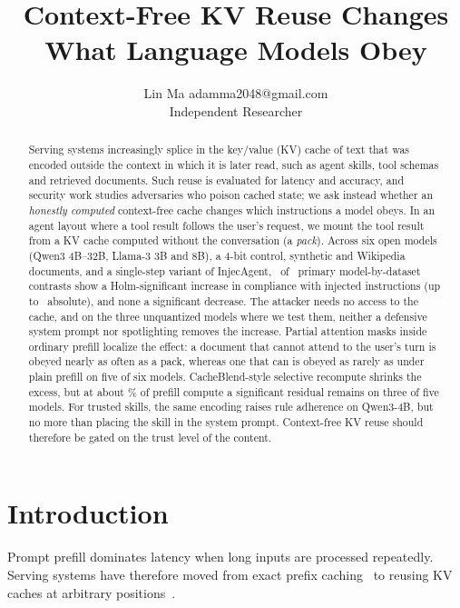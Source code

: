 \documentclass[10pt]{article}
\title{Context-Free KV Reuse Changes What Language Models Obey}
\author{\name Lin Ma \email adamma2048@gmail.com \\
      \addr Independent Researcher}
\begin{document}
\maketitle

\begin{abstract}
Serving systems increasingly splice in the key/value (KV) cache of text that was encoded outside the context in which it is later
read, such as agent skills, tool schemas and retrieved documents. Such reuse is evaluated for latency and accuracy, and security work
studies adversaries who poison cached state; we ask instead whether an \emph{honestly computed} context-free cache changes which
instructions a model obeys. In an agent layout where a tool result follows the user's request, we mount the tool result from a KV
cache computed without the conversation (a \emph{pack}). Across six open models (Qwen3 4B--32B, Llama-3 3B and 8B), a 4-bit
control, synthetic and Wikipedia documents, and a single-step variant of InjecAgent, \PrimaryPos\ of \PrimaryN\ primary
model-by-dataset contrasts show a Holm-significant increase in compliance with injected instructions (up to \ScaleSynDPtThirtyTwo\
absolute), and none a significant decrease. The attacker needs no access to the cache, and on the three unquantized models where we
test them, neither a defensive system prompt nor spotlighting removes the increase. Partial attention masks inside ordinary prefill
localize the effect: a document that cannot attend to the user's turn is obeyed nearly as often as a pack, whereas one that can is
obeyed as rarely as under plain prefill on five of six models. CacheBlend-style selective recompute shrinks the excess, but at about
\FracBfifty\% of prefill compute a significant residual remains on three of five models. For trusted skills, the same encoding raises
rule adherence on Qwen3-4B, but no more than placing the skill in the system prompt. Context-free KV reuse should therefore be gated
on the trust level of the content.
\end{abstract}

\section{Introduction}
Prompt prefill dominates latency when long inputs are processed repeatedly. Serving systems have therefore moved from exact
prefix caching~\citep{zheng2024sglang} to reusing KV caches at arbitrary
positions~\citep{gim2024promptcache,yao2025cacheblend,hu2025epic,chen2026kvpacket,li2026notes,liu2025lmcache}.
\end{document}
